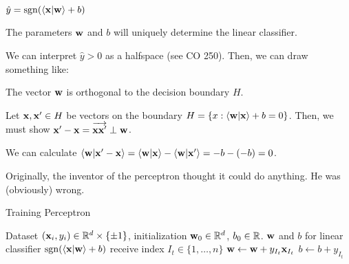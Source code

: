 \documentclass[class=cs480,notes,tikz]{agony}
\begin{document}
\begin{defn}
  $\hat y = \sgn(\ip{\vb x}{\vb w} + b)$
\end{defn}

The parameters $\vb w$ and $b$ will uniquely determine the linear classifier.

\begin{example}
  We can interpret $\hat y > 0$ as a halfspace (see CO 250).
  Then, we can draw something like:
  \begin{center}
  \end{center}
\end{example}

\begin{prop}
  The vector $\vb w$ is orthogonal to the decision boundary $H$.
\end{prop}
\begin{prf}
  Let $\vb x, \vb x' \in H$ be vectors on the boundary $H = \{x : \ip{\vb w}{\vb x} + b = 0\}$.
  Then, we must show $\vb x' - \vb x = \overrightarrow{\vb{xx'}} \perp \vb w$.

  We can calculate $\ip{\vb w}{\vb x' - \vb x}
    = \ip{\vb w}{\vb x} - \ip{\vb w}{\vb x'}
    = -b - (-b) = 0$.
\end{prf}

Originally, the inventor of the perceptron thought it could do anything.
He was (obviously) wrong.

\begin{algorithm}[H]
  \caption{Training Perceptron}
  \begin{algorithmic}
    \Require Dataset $(\vb x_i, y_i) \in \mathbb{R}^d \times \{\pm 1\}$,
    initialization $\vb w_0 \in \mathbb{R}^d$, $b_0 \in \mathbb{R}$.
    \Ensure $\vb w$ and $b$ for linear classifier $\sgn(\ip{\vb x}{\vb w} + b)$
      \State receive index $I_t \in \{1,\dotsc,n\}$
        \State $\vb w \gets \vb w + y_{I_t}\vb x_{I_t}$
        \State $b \gets b + y_{I_t}$
      \EndIf
    \EndFor
  \end{algorithmic}
\end{algorithm}
\end{document}
